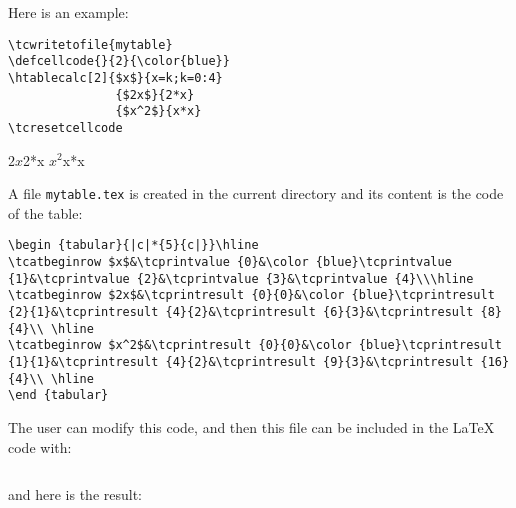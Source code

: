 \documentclass[a4paper,10pt]{article}
\newcommand\mywidth{0.85\linewidth}
\begin{document}
Here is an example:
\begin{center}
\begin{minipage}{\mywidth}
\begin{lstlisting}
\tcwritetofile{mytable}
\defcellcode{}{2}{\color{blue}}
\htablecalc[2]{$x$}{x=k;k=0:4}
               {$2x$}{2*x}
               {$x^2$}{x*x}
\tcresetcellcode
\end{lstlisting}
\end{minipage}
\end{center}
               {$2x$}{2*x}
               {$x^2$}{x*x}
\tcresetcellcode

A file \og\verb=mytable.tex=\fg{} is created in the current directory and its content is the code of the table:
\begin{center}
\begin{minipage}{\mywidth}
\begin{lstlisting}
\begin {tabular}{|c|*{5}{c|}}\hline
\tcatbeginrow $x$&\tcprintvalue {0}&\color {blue}\tcprintvalue {1}&\tcprintvalue {2}&\tcprintvalue {3}&\tcprintvalue {4}\\\hline
\tcatbeginrow $2x$&\tcprintresult {0}{0}&\color {blue}\tcprintresult {2}{1}&\tcprintresult {4}{2}&\tcprintresult {6}{3}&\tcprintresult {8}{4}\\ \hline
\tcatbeginrow $x^2$&\tcprintresult {0}{0}&\color {blue}\tcprintresult {1}{1}&\tcprintresult {4}{2}&\tcprintresult {9}{3}&\tcprintresult {16}{4}\\ \hline
\end {tabular}
\end{lstlisting}
\end{minipage}
\end{center}
The user can modify this code, and then this file can be included in the \LaTeX{} code with:
\begin{center}
\begin{minipage}{\mywidth}
\begin{lstlisting}

\end{lstlisting}
\end{minipage}
\end{center}
and here is the result:
\begin{center}

\end{center}
\end{document}
